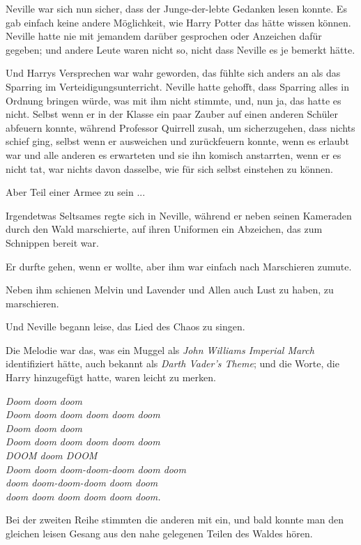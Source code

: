 Neville war sich nun sicher, dass der Junge-der-lebte Gedanken lesen konnte. Es
gab einfach keine andere Möglichkeit, wie Harry Potter das hätte wissen können.
Neville hatte nie mit jemandem darüber gesprochen oder Anzeichen dafür gegeben;
und andere Leute waren nicht so, nicht dass Neville es je bemerkt hätte.

Und Harrys Versprechen war wahr geworden, das fühlte sich anders an als das
Sparring im Verteidigungsunterricht. Neville hatte gehofft, dass Sparring alles
in Ordnung bringen würde, was mit ihm nicht stimmte, und, nun ja, das hatte es
nicht. Selbst wenn er in der Klasse ein paar Zauber auf einen anderen Schüler
abfeuern konnte, während Professor Quirrell zusah, um sicherzugehen, dass nichts
schief ging, selbst wenn er ausweichen und zurückfeuern konnte, wenn es erlaubt
war und alle anderen es erwarteten und sie ihn komisch anstarrten, wenn er es
nicht tat, war nichts davon dasselbe, wie für sich selbst einstehen zu können.

Aber Teil einer Armee zu sein ...

Irgendetwas Seltsames regte sich in Neville, während er neben seinen Kameraden
durch den Wald marschierte, auf ihren Uniformen ein Abzeichen, das zum Schnippen
bereit war.

Er durfte gehen, wenn er wollte, aber ihm war einfach nach Marschieren zumute.

Neben ihm schienen Melvin und Lavender und Allen auch Lust zu haben, zu
marschieren.

Und Neville begann leise, das Lied des Chaos zu singen.

Die Melodie war das, was ein Muggel als \emph{John Williams Imperial March}
identifiziert hätte, auch bekannt als \emph{\glqq{}Darth Vader's Theme\grqq{}};
und die Worte, die Harry hinzugefügt hatte, waren leicht zu merken.

\emph{Doom doom doom\\
Doom doom doom doom doom doom\\
Doom doom doom\\
Doom doom doom doom doom doom\\
DOOM doom DOOM\\
Doom doom doom-doom-doom doom doom\\
doom doom-doom-doom doom doom\\
doom doom doom doom doom doom.}

Bei der zweiten Reihe stimmten die anderen mit ein, und bald konnte man den
gleichen leisen Gesang aus den nahe gelegenen Teilen des Waldes hören.

